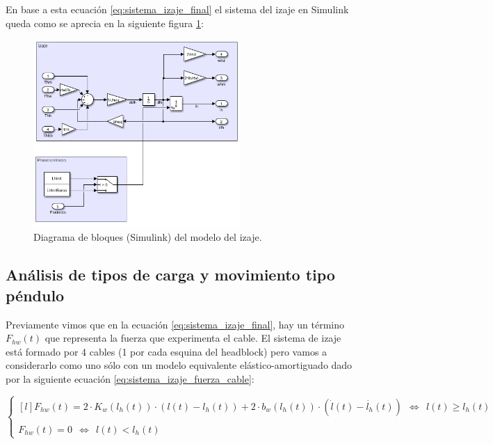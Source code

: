 \documentclass[11pt]{article}
\begin{document}
En base a esta ecuación \ref{eq:sistema_izaje_final} el sistema del izaje en Simulink queda como se aprecia en la siguiente figura \ref{fig:sistema_izaje_simulink}:

\begin{figure}[h!]
	\centering
	\includegraphics[width=0.7\textwidth]{images/imagen_6_simulink_izaje.png}
	\caption{Diagrama de bloques (Simulink) del modelo del izaje.}
	\label{fig:sistema_izaje_simulink}
\end{figure}

\newpage

\subsection{Análisis de tipos de carga y movimiento tipo péndulo}
\label{section:carga}

Previamente vimos que en la ecuación \ref{eq:sistema_izaje_final}, hay un término $F_{hw}(t)$ que representa la fuerza que experimenta el cable. El sistema de izaje está formado por 4 cables (1 por cada esquina del headblock) pero vamos a considerarlo como uno sólo con un modelo equivalente elástico-amortiguado dado por la siguiente ecuación \ref{eq:sistema_izaje_fuerza_cable}:

\begin{equation}
	\label{eq:sistema_izaje_fuerza_cable}
	\left\{
		\begin{matrix*}[l]
		F_{hw}(t)=2\cdot K_{w}\left ( l_{h}(t) \right )\cdot \left ( l(t)-l_{h}(t) \right )+2\cdot b_{w}\left ( l_{h}(t) \right )\cdot ( \dot{l}(t)-\dot{l_{h}}(t) ) \ \ \Leftrightarrow\ \ l(t)\geq l_{h}(t)
		\\
		\\ 
		F_{hw}(t)= 0\ \ \Leftrightarrow\ \ l(t)<l_{h}(t)
		\end{matrix*}
	\right.
\end{equation}
\end{document}
